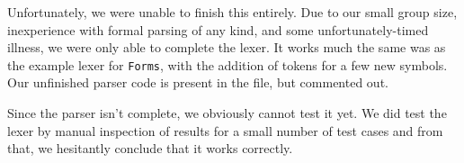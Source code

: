 \documentclass[a4paper,10pt]{article}
\numberwithin{equation}{section}%
\begin{document}
Unfortunately, we were unable to finish this entirely. Due to our small group size, inexperience with formal parsing of any kind, and some unfortunately-timed illness, we were only able to complete the lexer. It works much the same was as the example lexer for \texttt{Forms}, with the addition of tokens for a few new symbols. Our unfinished parser code is present in the file, but commented out.

Since the parser isn't complete, we obviously cannot test it yet. We did test the lexer by manual inspection of results for a small number of test cases and from that, we hesitantly conclude that it works correctly.

% 
\end{document}
